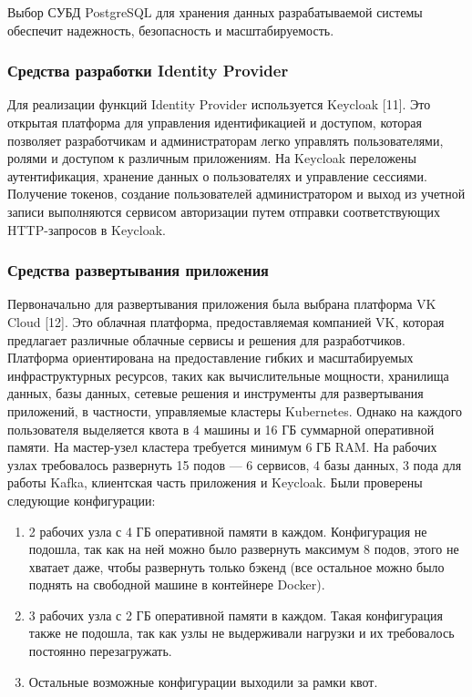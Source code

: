 \documentclass[a4paper, 12pt]{article}
\begin{document}
\begin{large}
Выбор СУБД PostgreSQL для хранения данных разрабатываемой системы обеспечит надежность, безопасность и масштабируемость. \\

\subsubsection{Средства разработки Identity Provider}
Для реализации функций Identity Provider используется Keycloak [11].
Это открытая платформа для управления идентификацией и доступом, которая позволяет разработчикам и администраторам легко управлять пользователями, ролями и доступом к различным приложениям.
На Keycloak переложены аутентификация, хранение данных о пользователях и управление сессиями.
Получение токенов, создание пользователей администратором и выход из учетной записи выполняются сервисом авторизации путем отправки соответствующих HTTP-запросов в Keycloak.

\subsubsection{Средства развертывания приложения}
Первоначально для развертывания приложения была выбрана платформа VK Cloud [12].
Это облачная платформа, предоставляемая компанией VK, которая предлагает различные облачные сервисы и решения для разработчиков. 
Платформа ориентирована на предоставление гибких и масштабируемых инфраструктурных ресурсов, таких как вычислительные мощности, хранилища данных, базы данных, сетевые решения и инструменты для развертывания приложений, в частности, управляемые кластеры Kubernetes.
Однако на каждого пользователя выделяется квота в 4 машины и 16 ГБ суммарной оперативной памяти.
На мастер-узел кластера требуется минимум 6 ГБ RAM.
На рабочих узлах требовалось развернуть 15 подов --- 6 сервисов, 4 базы данных, 3 пода для работы Kafka, клиентская часть приложения и Keycloak.
Были проверены следующие конфигурации:
\begin{enumerate}
	\item 2 рабочих узла с 4 ГБ оперативной памяти в каждом. Конфигурация не подошла, так как на ней можно было развернуть максимум 8 подов, этого не хватает даже, чтобы развернуть только бэкенд (все остальное можно было поднять на свободной машине в контейнере Docker).
	\item 3 рабочих узла с 2 ГБ оперативной памяти в каждом. Такая конфигурация также не подошла, так как узлы не выдерживали нагрузки и их требовалось постоянно перезагружать.
	\item Остальные возможные конфигурации выходили за рамки квот.
\end{enumerate}


\end{large}
\end{document}

